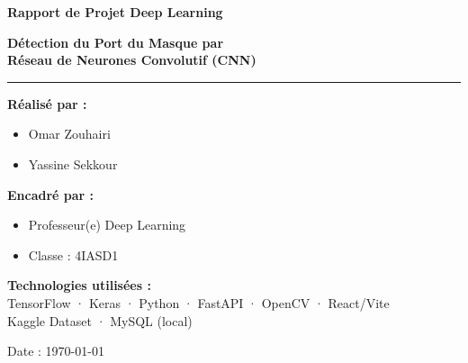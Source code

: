 \documentclass[11pt,a4paper]{article}
\title{}
\author{}
\date{}
\begin{document}
\thispagestyle{empty}
\vspace*{1cm}

\begin{center}
{\Large \textbf{Rapport de Projet Deep Learning}}
\end{center}

\vspace{2cm}

\begin{center}
{\LARGE \textbf{Détection du Port du Masque par\\Réseau de Neurones Convolutif (CNN)}}
\end{center}

\vspace{1cm}

\begin{center}
\rule{12cm}{0.5pt}
\end{center}

\vspace{2.5cm}

\begin{minipage}{0.45\textwidth}
\textbf{Réalisé par :}
\begin{itemize}
\item Omar Zouhairi
\item Yassine Sekkour
\end{itemize}
\end{minipage}%
\hfill%
\begin{minipage}{0.45\textwidth}
\textbf{Encadré par :}
\begin{itemize}
\item Professeur(e) Deep Learning
\item Classe : 4IASD1
\end{itemize}
\end{minipage}

\vspace{2cm}

\begin{center}
\textbf{Technologies utilisées :}\\
TensorFlow · Keras · Python · FastAPI · OpenCV · React/Vite\\
Kaggle Dataset · MySQL (local)
\end{center}

\vspace{2.5cm}

\begin{center}
Date : \today
\end{center}
\end{document}
